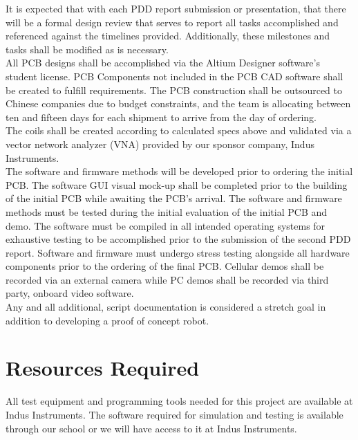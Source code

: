 \documentclass[12pt]{article}
\begin{document}
\indent
It is expected that with each PDD report submission or presentation, that there will be a formal design review that serves to report all tasks accomplished and referenced against the timelines provided.  Additionally, these milestones and tasks shall be modified as is necessary.\\

\indent
All PCB designs shall be accomplished via the Altium Designer software’s student license.  PCB Components not included in the PCB CAD software shall be created to fulfill requirements.  The PCB construction shall be outsourced to Chinese companies due to budget constraints, and the team is allocating between ten and fifteen days for each shipment to arrive from the day of ordering.\\

\pagebreak
\indent
The coils shall be created according to calculated specs above and validated via a vector network analyzer (VNA) provided by our sponsor company, Indus Instruments.\\

\indent
The software and firmware methods will be developed prior to ordering the initial PCB.  The software GUI visual mock-up shall be completed prior to the building of the initial PCB while awaiting the PCB’s arrival.  The software and firmware methods must be tested during the initial evaluation of the initial PCB and demo.  The software must be compiled in all intended operating systems for exhaustive testing to be accomplished prior to the submission of the second PDD report.  Software and firmware must undergo stress testing alongside all hardware components prior to the ordering of the final PCB.  Cellular demos shall be recorded via an external camera while PC demos shall be recorded via third party, onboard video software.\\

\indent
Any and all additional, script documentation is considered a stretch goal in addition to developing a proof of concept robot.

\section{Resources Required}

\indent \indent
All test equipment and programming tools needed for this project are available at Indus Instruments. The software required for simulation and testing is available through our school or we will have access to it at Indus Instruments.\\
\end{document}
